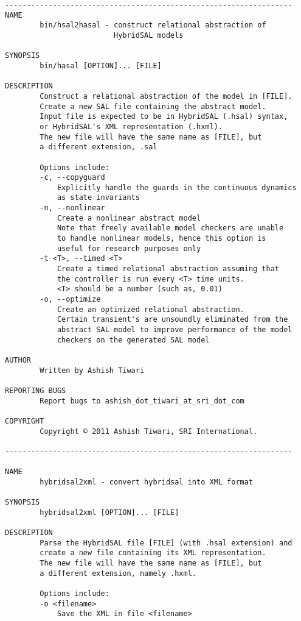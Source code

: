 \documentclass{llncs}
\begin{document}
\begin{tt}
\begin{verbatim}
------------------------------------------------------------------
NAME
        bin/hsal2hasal - construct relational abstraction of 
                         HybridSAL models

SYNOPSIS
        bin/hasal [OPTION]... [FILE]

DESCRIPTION
        Construct a relational abstraction of the model in [FILE].
        Create a new SAL file containing the abstract model.
        Input file is expected to be in HybridSAL (.hsal) syntax, 
        or HybridSAL's XML representation (.hxml).
        The new file will have the same name as [FILE], but
        a different extension, .sal

        Options include:
        -c, --copyguard
            Explicitly handle the guards in the continuous dynamics
            as state invariants
        -n, --nonlinear
            Create a nonlinear abstract model
            Note that freely available model checkers are unable
            to handle nonlinear models, hence this option is 
            useful for research purposes only
        -t <T>, --timed <T>
            Create a timed relational abstraction assuming that
            the controller is run every <T> time units.
            <T> should be a number (such as, 0.01)
        -o, --optimize
            Create an optimized relational abstraction.
            Certain transient's are unsoundly eliminated from the
            abstract SAL model to improve performance of the model 
            checkers on the generated SAL model

AUTHOR
        Written by Ashish Tiwari

REPORTING BUGS
        Report bugs to ashish_dot_tiwari_at_sri_dot_com

COPYRIGHT
        Copyright © 2011 Ashish Tiwari, SRI International.

------------------------------------------------------------------

NAME
        hybridsal2xml - convert hybridsal into XML format

SYNOPSIS
        hybridsal2xml [OPTION]... [FILE]

DESCRIPTION
        Parse the HybridSAL file [FILE] (with .hsal extension) and
        create a new file containing its XML representation.
        The new file will have the same name as [FILE], but
        a different extension, namely .hxml.

        Options include:
        -o <filename>
            Save the XML in file <filename>


\end{verbatim}
\end{tt}
\end{document}
